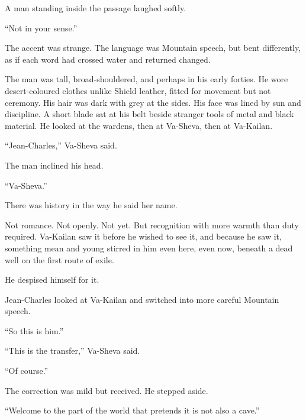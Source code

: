 A man standing inside the passage laughed softly.\par

“Not in your sense.”\par

The accent was strange. The language was Mountain speech, but bent differently, as if each word had crossed water and returned changed.\par

The man was tall, broad-shouldered, and perhaps in his early forties. He wore desert-coloured clothes unlike Shield leather, fitted for movement but not ceremony. His hair was dark with grey at the sides. His face was lined by sun and discipline. A short blade sat at his belt beside stranger tools of metal and black material. He looked at the wardens, then at Va-Sheva, then at Va-Kailan.\par

“Jean-Charles,” Va-Sheva said.\par

The man inclined his head.\par

“Va-Sheva.”\par

There was history in the way he said her name.\par

Not romance. Not openly. Not yet. But recognition with more warmth than duty required. Va-Kailan saw it before he wished to see it, and because he saw it, something mean and young stirred in him even here, even now, beneath a dead well on the first route of exile.\par

He despised himself for it.\par

Jean-Charles looked at Va-Kailan and switched into more careful Mountain speech.\par

“So this is him.”\par

“This is the transfer,” Va-Sheva said.\par

“Of course.”\par

The correction was mild but received. He stepped aside.\par

“Welcome to the part of the world that pretends it is not also a cave.”\par

